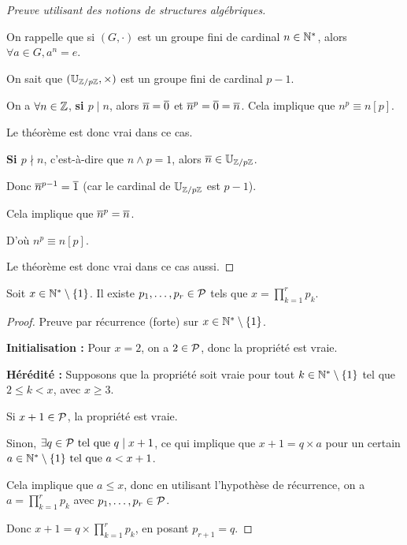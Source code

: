 \documentclass[12pt,a4paper]{report}
\begin{document}
\begin{proof}[Preuve utilisant des notions de structures algébriques]
    \begin{center}
        On rappelle que si $(G,\cdot)$ est un groupe fini de cardinal $n \in \mathbb{N}^*$, alors $\forall a \in G, a^n = e$.
    \end{center}

    On sait que $(\mathbb{U}_{\mathbb{Z}/p\mathbb{Z}}, \times)$ est un groupe fini de cardinal $p-1$.

    On a $\forall n \in \mathbb{Z}$, \textbf{si $p\mid n$}, alors $\overline{n} = \overline{0}$ et $\overline{n}^p = \overline{0} = \overline{n}$. Cela implique que $n^p \equiv n [p]$.

    Le théorème est donc vrai dans ce cas.

    \textbf{Si $p \nmid n$}, c'est-à-dire que $n\wedge p = 1$, alors $\overline{n} \in \mathbb{U}_{\mathbb{Z}/p\mathbb{Z}}$.

    Donc $\overline{n}^{p-1} = \overline{1}$ (car le cardinal de $\mathbb{U}_{\mathbb{Z}/p\mathbb{Z}}$ est $p-1$).

    Cela implique que $\overline{n}^p = \overline{n}$.

    D'où $n^p \equiv n [p]$.

    Le théorème est donc vrai dans ce cas aussi.
\end{proof}

\begin{theorem}
    Soit $x \in \mathbb{N}^*\setminus\{1\}$. Il existe $p_1,\dots,p_r \in \mathcal{P}$ tels que $x=\prod_{k=1}^{r}p_k$.
\end{theorem}

\begin{proof}
    Preuve par récurrence (forte) sur $x\in\mathbb{N}^*\setminus\{1\}$.

    \textbf{Initialisation :} Pour $x=2$, on a $2 \in \mathcal{P}$, donc la propriété est vraie.

    \textbf{Hérédité :} Supposons que la propriété soit vraie pour tout $k \in \mathbb{N}^*\setminus\{1\}$ tel que $2 \le k < x$, avec $x \ge 3$.

    Si $x+1 \in \mathcal{P}$, la propriété est vraie.

    Sinon, $\exists q \in \mathcal{P} \text{ tel que } q \mid x+1$, ce qui implique que $x+1 = q \times a$ pour un certain $a \in \mathbb{N}^*\setminus\{1\} \text{ tel que } a < x+1$.

    Cela implique que $a\le x$, donc en utilisant l'hypothèse de récurrence, on a $a = \prod_{k=1}^{r} p_k$ avec $p_1,\dots,p_r \in \mathcal{P}$.

    Donc $x+1 = q \times \prod_{k=1}^{r} p_k$, en posant $p_{r+1} = q$.
\end{proof}
\end{document}
